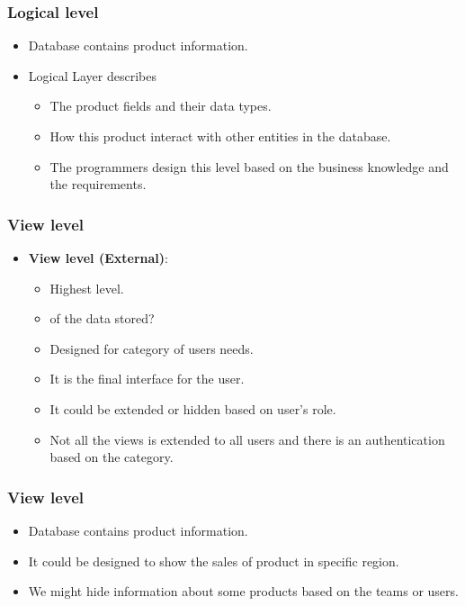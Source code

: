 \begin{frame}
	\frametitle{Logical level}
	\begin{example}
		\begin{itemize}[<+->]
			\item Database contains product information.
			\item Logical Layer describes
			\begin{itemize}[<+->]
				\item The product fields and their data types.
				\item How this product interact with other entities in the database.
				\item The programmers design this level based on the business knowledge and the requirements.
			\end{itemize}
		\end{itemize}
	\end{example}
	
\end{frame}
\begin{frame}
	\frametitle{View level}
	\begin{itemize}[<+->]
		\item \textbf{View level (External)}: 
		\begin{itemize}[<+->]
			\item Highest level.
			\item \textbf{\underline{}} of the data stored?  
			\item Designed for category of users needs.
			\item It is the final interface for the user.
			\item It could be extended or hidden based on user's role.
			\item Not all the views is extended to all users and there is an authentication based on the category.
		\end{itemize}		
	\end{itemize}	
	
\end{frame}
\begin{frame}
	\frametitle{View level}
	\begin{example}
		\begin{itemize}[<+->]
			\item Database contains product information.
			\item It could be designed to show the sales of product in specific region.
			\item We might hide information about some products based on the teams or users.
		\end{itemize}
	\end{example}
	
\end{frame}
